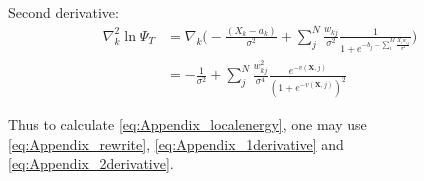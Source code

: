 \documentclass[%
oneside,                 %
final,                   %
10pt]{article}
\begin{document}
\begin{appendices}
Second derivative:
\begin{equation}
\begin{aligned}
\nabla_k^2  \ln \Psi_T &= \nabla_k  \big( 
   - \frac{(X_k - a_k)}{\sigma^2} + \sum_{j}^N \frac{w_{kj}}{\sigma^2}\frac{1}{1 + e^{-b_j  -\sum_i^M \frac{X_i w_{ij}}{\sigma^2}}}  \big) \\
  &=
 - \frac{1}{\sigma^2} + \sum_{j}^N \frac{w_{kj}^2}{\sigma^4}\frac{e^{-v(\bm X,j)}}{ ( 1 + e^{-v(\bm X,j)} )^2}  
\end{aligned}
\label{eq:Appendix_2derivative}
\end{equation}

Thus to calculate \eqref{eq:Appendix_localenergy}, one may use \eqref{eq:Appendix_rewrite}, \eqref{eq:Appendix_1derivative} and \eqref{eq:Appendix_2derivative}.


\end{appendices}
\end{document}
